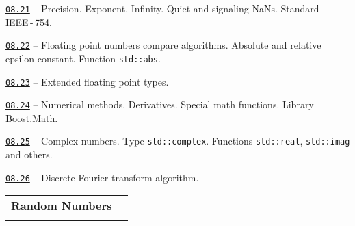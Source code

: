 \documentclass[a4paper,12pt]{article}
\renewenvironment{itemize}
{
    \begin{list}{\labelitemi}
    {
      \setlength{\topsep}{0pt}
      \setlength{\partopsep}{0pt}
      \setlength{\parskip}{0pt}
      \setlength{\itemsep}{0pt}
      \setlength{\parsep}{0pt}
      \setlength{\leftmargin}{14.5pt}
    }
}{\end{list}}
\begin{document}
\begin{itemize}

    \item \href{https://github.com/i-s-m-mipt/Education/blob/master/projects/examples/source/08.21.cpp}{\texttt{08.21}} -- Precision. Exponent. Infinity. Quiet and signaling NaNs. Standard IEEE\,-\,754.

    \smallskip

    \item \href{https://github.com/i-s-m-mipt/Education/blob/master/projects/examples/source/08.22.cpp}{\texttt{08.22}} -- Floating point numbers compare algorithms. Absolute and relative epsilon constant. Function \lstinline{std::abs}.

    \smallskip

    \item \href{https://github.com/i-s-m-mipt/Education/blob/master/projects/examples/source/08.23.cpp}{\texttt{08.23}} -- Extended floating point types.

    \smallskip

    \item \href{https://github.com/i-s-m-mipt/Education/blob/master/projects/examples/source/08.24.cpp}{\texttt{08.24}} -- Numerical methods. Derivatives. Special math functions. Library \href{https://www.boost.org/doc/libs/1_84_0/libs/math/doc/html/index.html}{Boost.Math}.

    \smallskip

    \item \href{https://github.com/i-s-m-mipt/Education/blob/master/projects/examples/source/08.25.cpp}{\texttt{08.25}} -- Complex numbers. Type \lstinline{std::complex}. Functions \lstinline{std::real}, \lstinline{std::imag} and others.

    \smallskip

    \item \href{https://github.com/i-s-m-mipt/Education/blob/master/projects/examples/source/08.26.cpp}{\texttt{08.26}} -- Discrete Fourier transform algorithm.

\end{itemize}

\bigskip\medskip

\begin{tabular}{!{\vrule width 1pt}L{3.6cm}!{\vrule width 1pt}L{15.4cm}!{\vrule width 0pt}} 


\textbf{Random Numbers} & \\


\end{tabular}
\end{document}
